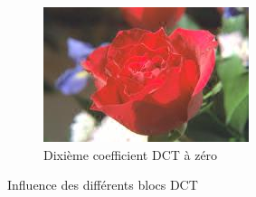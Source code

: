 \begin{figure}[H]
\begin{subfigure}[b]{0.3\textwidth}
        \includegraphics[width=\textwidth]{img/tot10.jpg}
        \caption{Dixième coefficient DCT à zéro}
        \label{img:4}
    \end{subfigure}
    \caption{Influence des différents blocs DCT}\label{fig:DCT}
\end{figure}
